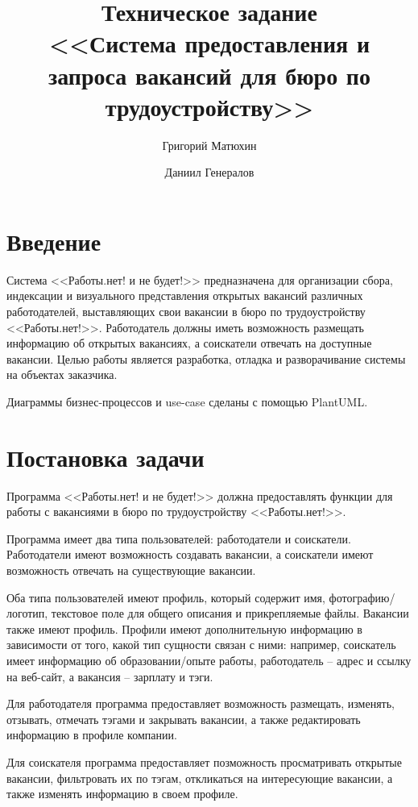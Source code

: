\documentclass[a4page]{article}
\author{Григорий Матюхин \and Даниил Генералов}
\date{\DTMDisplaydate{2024}{2}{27}{-1}}
\title{Техническое задание\\ \Large<<Система предоставления и запроса вакансий для бюро по трудоустройству>>}
\begin{document}
\maketitle
\thispagestyle{empty}

\newpage

\tableofcontents

\newpage

\section{Введение}

Система <<Работы.нет! и не будет!>> предназначена для организации сбора, индексации и визуального представления открытых вакансий различных работодателей, выставляющих свои вакансии в бюро по трудоустройству <<Работы.нет!>>. Работодатель должны иметь возможность размещать информацию об открытых вакансиях, а соискатели отвечать на доступные вакансии.
Целью работы является разработка, отладка и разворачивание системы на объектах заказчика.

Диаграммы бизнес-процессов и use-case сделаны с помощью PlantUML.

\newpage
\section{Постановка задачи}

Программа <<Работы.нет! и не будет!>> должна предоставлять функции для работы с вакансиями в бюро по трудоустройству <<Работы.нет!>>.

Программа имеет два типа пользователей: работодатели и соискатели. Работодатели имеют возможность создавать вакансии,
а соискатели имеют возможность отвечать на существующие вакансии.

Оба типа пользователей имеют профиль, который содержит имя, фотографию/логотип, текстовое поле для общего описания и прикрепляемые файлы.
Вакансии также имеют профиль. Профили имеют дополнительную информацию в зависимости от того, какой тип сущности связан с ними:
например, соискатель имеет информацию об образовании/опыте работы, работодатель -- адрес и ссылку на веб-сайт,
а вакансия -- зарплату и тэги.

Для работодателя программа предоставляет возможность размещать, изменять, отзывать, отмечать тэгами и закрывать вакансии, а также редактировать информацию в профиле компании.

Для соискателя программа предоставляет позможность просматривать открытые вакансии, фильтровать их по тэгам, откликаться на интересующие вакансии, а также изменять информацию в своем профиле.
\end{document}
